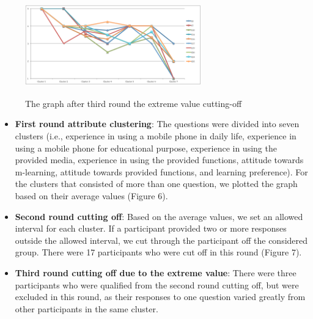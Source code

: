 \documentclass[a4paper,twoside]{article}
\begin{document}
\begin{figure}
\centering
\includegraphics[height=1.7in, width=3in]{fig8}
\caption{The graph after third round the extreme value cutting-off}
\end{figure}

\begin{itemize} 
\item \textbf{First round attribute clustering}: The questions were divided into seven clusters (i.e., experience in using a mobile phone in daily life, experience in using a mobile phone for educational purpose, experience in using the provided media, experience in using the provided functions, attitude towards m-learning, attitude towards provided functions, and learning preference). For the clusters that consisted of more than one question, we plotted the graph based on their average values (Figure 6).


\item \textbf{Second round cutting off}: Based on the average values, we set an allowed interval for each cluster.  If a participant provided two or more responses outside the allowed interval, we cut through the participant off the considered group. There were 17 participants who were cut off in this round (Figure 7). 

\item \textbf{Third round cutting off due to the extreme value}: There were three participants who were qualified from the second round cutting off, but were excluded in this round, as their responses to one question varied greatly from other participants in the same cluster.

\end{itemize}
\end{document}

